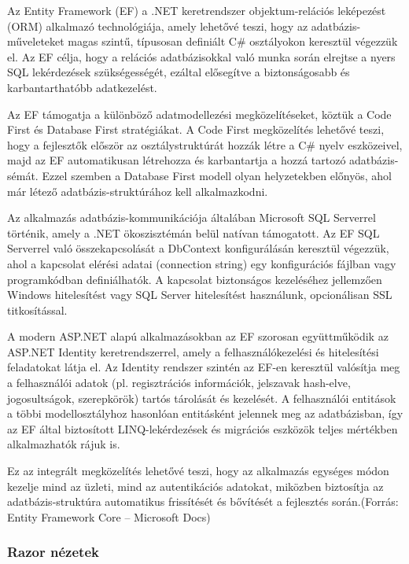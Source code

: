 \indent Az Entity Framework (EF) a .NET keretrendszer objektum-relációs leképezést (ORM) alkalmazó technológiája, amely lehetővé teszi, hogy az adatbázis-műveleteket magas szintű, típusosan definiált C\# osztályokon keresztül végezzük el. Az EF célja, hogy a relációs adatbázisokkal való munka során elrejtse a nyers SQL lekérdezések szükségességét, ezáltal elősegítve a biztonságosabb és karbantarthatóbb adatkezelést.

Az EF támogatja a különböző adatmodellezési megközelítéseket, köztük a Code First és Database First stratégiákat. A Code First megközelítés lehetővé teszi, hogy a fejlesztők először az osztálystruktúrát hozzák létre a C\# nyelv eszközeivel, majd az EF automatikusan létrehozza és karbantartja a hozzá tartozó adatbázis-sémát. Ezzel szemben a Database First modell olyan helyzetekben előnyös, ahol már létező adatbázis-struktúrához kell alkalmazkodni.

Az alkalmazás adatbázis-kommunikációja általában Microsoft SQL Serverrel történik, amely a .NET ökoszisztémán belül natívan támogatott. Az EF SQL Serverrel való összekapcsolását a DbContext konfigurálásán keresztül végezzük, ahol a kapcsolat elérési adatai (connection string) egy konfigurációs fájlban vagy programkódban definiálhatók. A kapcsolat biztonságos kezeléséhez jellemzően Windows hitelesítést vagy SQL Server hitelesítést használunk, opcionálisan SSL titkosítással.

A modern ASP.NET alapú alkalmazásokban az EF szorosan együttműködik az ASP.NET Identity keretrendszerrel, amely a felhasználókezelési és hitelesítési feladatokat látja el. Az Identity rendszer szintén az EF-en keresztül valósítja meg a felhasználói adatok (pl. regisztrációs információk, jelszavak hash-elve, jogosultságok, szerepkörök) tartós tárolását és kezelését. A felhasználói entitások a többi modellosztályhoz hasonlóan entitásként jelennek meg az adatbázisban, így az EF által biztosított LINQ-lekérdezések és migrációs eszközök teljes mértékben alkalmazhatók rájuk is.

Ez az integrált megközelítés lehetővé teszi, hogy az alkalmazás egységes módon kezelje mind az üzleti, mind az autentikációs adatokat, miközben biztosítja az adatbázis-struktúra automatikus frissítését és bővítését a fejlesztés során.(Forrás: Entity Framework Core – Microsoft Docs)

\subsubsection{Razor nézetek}


